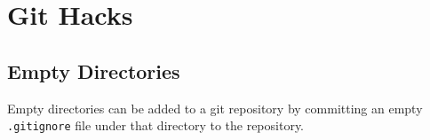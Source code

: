 \section*{Git Hacks}
\subsection*{Empty Directories}
Empty directories can be added to a git repository by committing an empty {\tt .gitignore} file under that directory to the repository.
